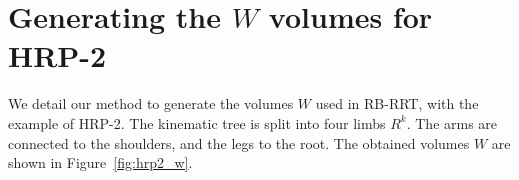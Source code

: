 \documentclass[journal]{IEEEtran}
\begin{document}






%


\appendices


\section{Generating the $W$ volumes for HRP-2}
\label{app:rom}

We detail our method to generate the volumes $W$ used
in RB-RRT, with the example of HRP-2.
The kinematic tree is split into four limbs $R^k$.
The arms are connected to the shoulders, and the legs to the root.
The obtained volumes $W$ are shown in Figure~\ref{fig:hrp2_w}.
\end{document}
